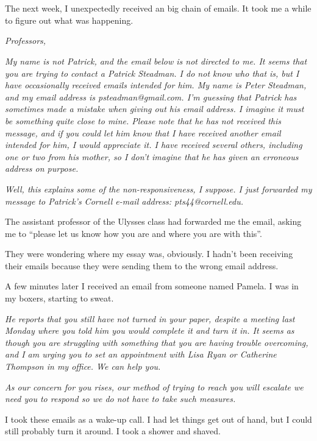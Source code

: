 \section{}

The next week, I unexpectedly received an big chain of emails.  It took me a
while to figure out what was happening.

\textit{Professors,}

\textit{My name is not Patrick, and the email below is not directed to me.  It seems
that you are trying to contact a Patrick Steadman.  I do not know who that is,
but I have occasionally received emails intended for him.  My name is Peter
Steadman, and my email address is psteadman@gmail.com.  I'm guessing that
Patrick has sometimes made a mistake when giving out his email address.  I
imagine it must be something quite close to mine.  Please note that he has not
received this message, and if you could let him know that I have received
another email intended for him, I would appreciate it.  I have received
several others, including one or two from his mother, so I don't imagine that
he has given an erroneous address on purpose.
}


\textit{Well, this explains some of the non-responsiveness, I suppose.  I just
forwarded my message to Patrick's Cornell e-mail address:  pts44@cornell.edu.}


The assistant professor of the Ulysses class had forwarded me the email, asking
me to ``please let us know how you are and where you are with this''. 

They were wondering where my essay was, obviously.  I hadn't been receiving
their emails because they were sending them to the wrong email address.

A few minutes later I received an email from someone named Pamela.  I was in my
boxers, starting to sweat.

\textit{
He reports that you still have not turned in your paper, despite a meeting last
Monday where you told him you would complete it and turn it in.  It seems as
though you are struggling with something that you are having trouble
overcoming, and I am urging you to set an appointment with Lisa Ryan or
Catherine Thompson in my office.  We can help you. }

\textit{
As our concern for you rises, our method of trying to reach you will escalate 
we need you to respond so we do not have to take such measures.}


I took these emails as a wake-up call.  I had let things get out of hand, but I
could still probably turn it around.  I took a shower and shaved. 

